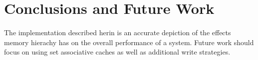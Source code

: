 \documentclass[11pt,letterpaper,final]{article}
\begin{document}
\section{ Conclusions and Future Work }
\paragraph{}
The implementation described herin is an accurate depiction of the effects memory hierachy has on the overall performance of a system.  Future work should focus on using set associative caches as well as additional write strategies.

\pagebreak{}
\appendixpage
\appendix
\end{document}
